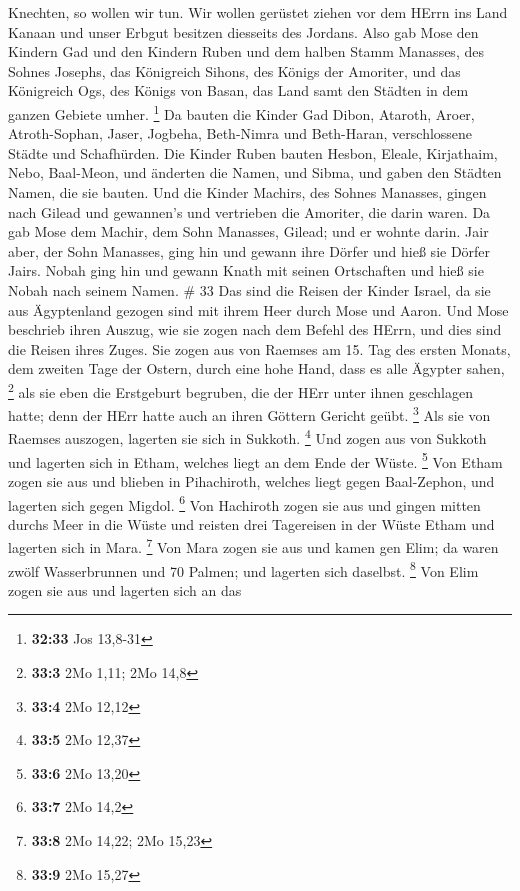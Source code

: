 Knechten, so wollen wir tun.  Wir wollen gerüstet ziehen
vor dem HErrn ins Land Kanaan und unser Erbgut besitzen diesseits des
Jordans.  Also gab Mose den Kindern Gad und den Kindern
Ruben und dem halben Stamm Manasses, des Sohnes Josephs, das Königreich
Sihons, des Königs der Amoriter, und das Königreich Ogs, des Königs von
Basan, das Land samt den Städten in dem ganzen Gebiete umher.
\footnote{\textbf{32:33} Jos 13,8-31}  Da bauten die Kinder
Gad Dibon, Ataroth, Aroer,  Atroth-Sophan, Jaser, Jogbeha,
 Beth-Nimra und Beth-Haran, verschlossene Städte und
Schafhürden.  Die Kinder Ruben bauten Hesbon, Eleale,
Kirjathaim,  Nebo, Baal-Meon, und änderten die Namen, und
Sibma, und gaben den Städten Namen, die sie bauten.  Und
die Kinder Machirs, des Sohnes Manasses, gingen nach Gilead und
gewannen's und vertrieben die Amoriter, die darin waren. 
Da gab Mose dem Machir, dem Sohn Manasses, Gilead; und er wohnte darin.
 Jair aber, der Sohn Manasses, ging hin und gewann ihre
Dörfer und hieß sie Dörfer Jairs.  Nobah ging hin und
gewann Knath mit seinen Ortschaften und hieß sie Nobah nach seinem
Namen. \# 33  Das sind die Reisen der Kinder Israel, da sie
aus Ägyptenland gezogen sind mit ihrem Heer durch Mose und Aaron.
 Und Mose beschrieb ihren Auszug, wie sie zogen nach dem
Befehl des HErrn, und dies sind die Reisen ihres Zuges.  Sie
zogen aus von Raemses am 15. Tag des ersten Monats, dem zweiten Tage der
Ostern, durch eine hohe Hand, dass es alle Ägypter sahen, \footnote{\textbf{33:3}
  2Mo 1,11; 2Mo 14,8}  als sie eben die Erstgeburt begruben,
die der HErr unter ihnen geschlagen hatte; denn der HErr hatte auch an
ihren Göttern Gericht geübt. \footnote{\textbf{33:4} 2Mo 12,12}
 Als sie von Raemses auszogen, lagerten sie sich in Sukkoth.
\footnote{\textbf{33:5} 2Mo 12,37}  Und zogen aus von
Sukkoth und lagerten sich in Etham, welches liegt an dem Ende der Wüste.
\footnote{\textbf{33:6} 2Mo 13,20}  Von Etham zogen sie aus
und blieben in Pihachiroth, welches liegt gegen Baal-Zephon, und
lagerten sich gegen Migdol. \footnote{\textbf{33:7} 2Mo 14,2}
 Von Hachiroth zogen sie aus und gingen mitten durchs Meer
in die Wüste und reisten drei Tagereisen in der Wüste Etham und lagerten
sich in Mara. \footnote{\textbf{33:8} 2Mo 14,22; 2Mo 15,23} 
Von Mara zogen sie aus und kamen gen Elim; da waren zwölf Wasserbrunnen
und 70 Palmen; und lagerten sich daselbst. \footnote{\textbf{33:9} 2Mo
  15,27}  Von Elim zogen sie aus und lagerten sich an das
